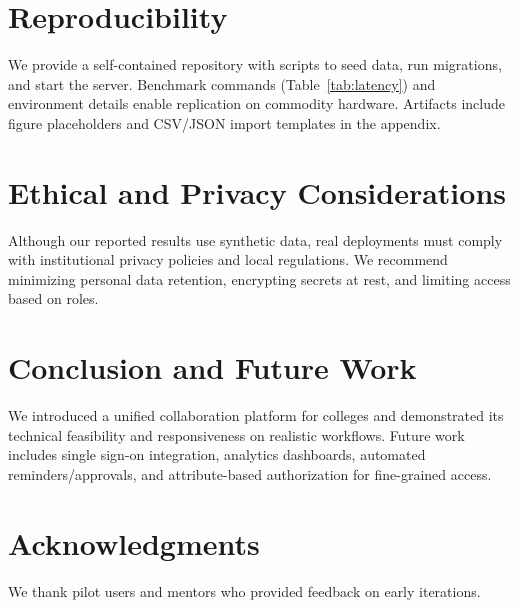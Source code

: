 \documentclass[conference]{IEEEtran}
\begin{document}
\section{Reproducibility}
We provide a self-contained repository with scripts to seed data, run migrations, and start the server. Benchmark commands (Table~\ref{tab:latency}) and environment details enable replication on commodity hardware. Artifacts include figure placeholders and CSV/JSON import templates in the appendix.

\section{Ethical and Privacy Considerations}
Although our reported results use synthetic data, real deployments must comply with institutional privacy policies and local regulations. We recommend minimizing personal data retention, encrypting secrets at rest, and limiting access based on roles.

\section{Conclusion and Future Work}
We introduced a unified collaboration platform for colleges and demonstrated its technical feasibility and responsiveness on realistic workflows. Future work includes single sign-on integration, analytics dashboards, automated reminders/approvals, and attribute-based authorization for fine-grained access.

\section*{Acknowledgments}
We thank pilot users and mentors who provided feedback on early iterations.
\end{document}
